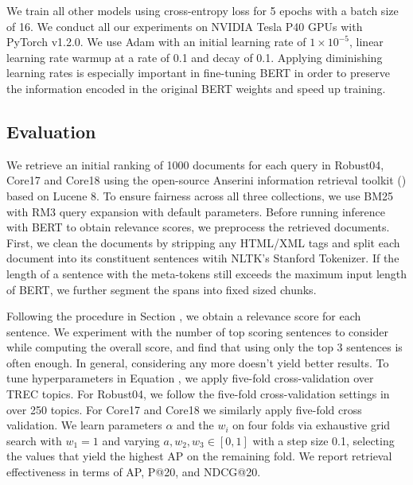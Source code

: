 We train all other models using cross-entropy loss for 5 epochs with a batch size of 16.
We conduct all our experiments on NVIDIA Tesla P40 GPUs with PyTorch v1.2.0.
We use Adam \cite{kingma2014adam} with an initial learning rate of $ 1 \times 10^{-5}$, linear learning rate warmup at a rate of 0.1 and decay of 0.1.
Applying diminishing learning rates is especially important in fine-tuning BERT in order to preserve the information encoded in the original BERT weights and speed up training.

\subsection{Evaluation}

We retrieve an initial ranking of 1000 documents for each query in Robust04, Core17 and Core18 using the open-source Anserini information retrieval toolkit () based on Lucene 8.
To ensure fairness across all three collections, we use BM25 with RM3 query expansion with default parameters.
Before running inference with BERT to obtain relevance scores, we preprocess the retrieved documents.
First, we clean the documents by stripping any HTML/XML tags and split each document into its constituent sentences witih NLTK's Stanford Tokenizer.
If the length of a sentence with the meta-tokens still exceeds the maximum input length of BERT, we further segment the spans into fixed sized chunks.

Following the procedure in Section , we obtain a relevance score for each sentence.
We experiment with the number of top scoring sentences to consider while computing the overall score, and find that using only the top 3 sentences is often enough.
In general, considering any more doesn't yield better results.
To tune hyperparameters in Equation , we apply five-fold cross-validation over TREC topics.
For Robust04, we follow the five-fold cross-validation settings in~\cite{lin2019neural} over 250 topics.
For Core17 and Core18 we similarly apply five-fold cross validation.
We learn parameters $\alpha$ and the $w_i$ on four folds via exhaustive grid search with $ w_1 = 1 $ and varying $ a, w_2, w_3 \in [0, 1] $ with a step size 0.1, selecting the values that yield the highest AP on the remaining fold.
We report retrieval effectiveness in terms of AP, P@20, and NDCG@20.